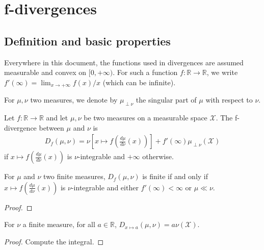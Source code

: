 \chapter{f-divergences}

\section{Definition and basic properties}

Everywhere in this document, the functions used in divergences are assumed measurable and convex on $[0, +\infty)$.
For such a function $f : \mathbb{R} \to \mathbb{R}$, we write $f'(\infty) = \lim_{x \to +\infty} f(x)/x$ (which can be infinite).

For $\mu, \nu$ two measures, we denote by $\mu_{\perp \nu}$ the singular part of $\mu$ with respect to $\nu$.

\begin{definition}[f-divergence]
  \label{def:fDiv}
  \leanok
  Let $f : \mathbb{R} \to \mathbb{R}$ and let $\mu, \nu$ be two measures on a measurable space $\mathcal X$. The f-divergence between $\mu$ and $\nu$ is
  \begin{align*}
  D_f(\mu, \nu) = \nu\left[x \mapsto f\left(\frac{d \mu}{d \nu}(x)\right)\right] + f'(\infty) \mu_{\perp \nu}(\mathcal X)
  \end{align*}
  if $x \mapsto f\left(\frac{d \mu}{d \nu}(x)\right)$ is $\nu$-integrable and $+\infty$ otherwise.
\end{definition}

\begin{lemma}
  \label{lem:fDiv_ne_top_iff}
  \leanok
  For $\mu$ and $\nu$ two finite measures, $D_f(\mu, \nu)$ is finite if and only if $x \mapsto f\left(\frac{d \mu}{d \nu}(x)\right)$ is $\nu$-integrable and either $f'(\infty) < \infty$ or $\mu \ll \nu$.
\end{lemma}

\begin{proof}\leanok
\end{proof}

\begin{lemma}
  \label{lem:fDiv_const}
  \leanok
  For $\nu$ a finite measure, for all $a \in \mathbb{R}$, $D_{x \mapsto a}(\mu, \nu) = a \nu(\mathcal X)$.
\end{lemma}

\begin{proof} \leanok
Compute the integral.
\end{proof}

